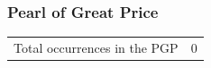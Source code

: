 	\subsubsection{Pearl of Great Price} %
		\label{ADVOCATE-PGP}
	
		\begin{tabular}{ll}
			Total occurrences in the PGP & 0
		\end{tabular}
		
		

	


	
